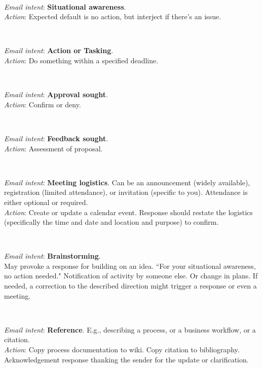 \ \\
\begin{samepage}
\textit{Email intent}: \textbf{Situational awareness}.\\
\textit{Action}: Expected default is no action, but interject if there's an issue.
\end{samepage}

\ \\
\begin{samepage}
\textit{Email intent}: \textbf{Action or Tasking}.\\
\textit{Action}: Do something within a specified deadline.
\end{samepage}

\ \\
\begin{samepage}
\textit{Email intent}: \textbf{Approval sought}.\\
\textit{Action}: Confirm or deny.
\end{samepage}

\ \\
\begin{samepage}
\textit{Email intent}: \textbf{Feedback sought}.\\
\textit{Action}: Assessment of proposal.
\end{samepage}

\ \\
\begin{samepage}
\textit{Email intent}: \textbf{Meeting logistics}. Can be an announcement (widely available), registration (limited attendance), or invitation (specific to you). Attendance is either optional or required. \\
\textit{Action}: Create or update a calendar event.
Response should restate the logistics (specifically the time and date and location and purpose) to confirm. 
\end{samepage}

\ \\
\begin{samepage}
\textit{Email intent}: \textbf{Brainstorming}.\\
May provoke a response for building on an idea.
``For your situational awareness, no action needed." Notification of activity by someone else. Or change in plans. 
If needed, a correction to the described direction might trigger a response or even a meeting.
\end{samepage}

\ \\
\begin{samepage}
\textit{Email intent}: \textbf{Reference}. E.g., describing a process, or a business workflow, or a citation.\\
\textit{Action}: Copy process documentation to wiki. Copy citation to bibliography.
Acknowledgement response thanking the sender for the update or clarification.
\end{samepage}

